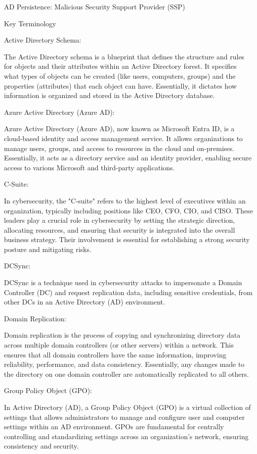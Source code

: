 
AD Persistence: Malicious Security Support Provider (SSP)

Key Terminology

Active Directory Schema:

The Active Directory schema is a blueprint that defines the structure and rules for objects and their attributes within an Active Directory forest. It specifies what types of objects can be created (like users, computers, groups) and the properties (attributes) that each object can have. Essentially, it dictates how information is organized and stored in the Active Directory database.

Azure Active Directory (Azure AD):

Azure Active Directory (Azure AD), now known as Microsoft Entra ID, is a cloud-based identity and access management service. It allows organizations to manage users, groups, and access to resources in the cloud and on-premises. Essentially, it acts as a directory service and an identity provider, enabling secure access to various Microsoft and third-party applications.

C-Suite:

In cybersecurity, the "C-suite" refers to the highest level of executives within an organization, typically including positions like CEO, CFO, CIO, and CISO. These leaders play a crucial role in cybersecurity by setting the strategic direction, allocating resources, and ensuring that security is integrated into the overall business strategy. Their involvement is essential for establishing a strong security posture and mitigating risks.

DCSync:

DCSync is a technique used in cybersecurity attacks to impersonate a Domain Controller (DC) and request replication data, including sensitive credentials, from other DCs in an Active Directory (AD) environment.

Domain Replication:

Domain replication is the process of copying and synchronizing directory data across multiple domain controllers (or other servers) within a network. This ensures that all domain controllers have the same information, improving reliability, performance, and data consistency. Essentially, any changes made to the directory on one domain controller are automatically replicated to all others.

Group Policy Object (GPO):

In Active Directory (AD), a Group Policy Object (GPO) is a virtual collection of settings that allows administrators to manage and configure user and computer settings within an AD environment. GPOs are fundamental for centrally controlling and standardizing settings across an organization's network, ensuring consistency and security.

